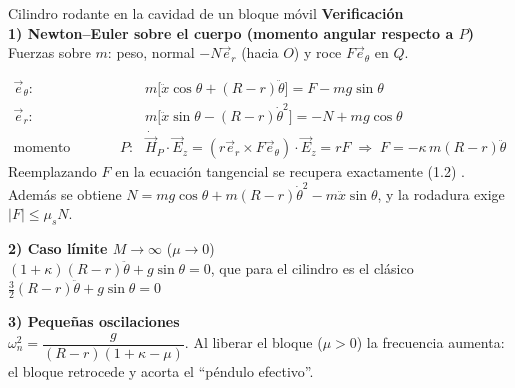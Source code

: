 \begin{solucion}{Cilindro rodante en la cavidad de un bloque móvil}
\textbf{Verificación}\\
\textbf{1) Newton--Euler sobre el cuerpo (momento angular respecto a $P$)}\\
Fuerzas sobre $m$: peso, normal $-N\vec{e}_r$ (hacia $O$) y roce $F\vec{e}_\theta$ en $Q$.
\begin{center}
\end{center}
\begin{align*}
\vec{e}_\theta:&\quad m\big[\ddot x\cos\theta + (R-r)\ddot\theta\big] = F - m g\sin\theta \\
\vec{e}_r:&\quad m\big[\ddot x\sin\theta - (R-r)\dot\theta^2\big] = -N + m g\cos\theta \\
\text{momento angular en }P:&\quad \dot{\vec{H}}_P\cdot\vec{E}_z = (r\vec{e}_r\times F\vec{e}_\theta)\cdot\vec{E}_z = rF
\;\Rightarrow\; F = -\kappa\, m (R-r)\ddot\theta
\end{align*}
Reemplazando $F$ en la ecuación tangencial se recupera exactamente (1.2) \checkmark. Además se obtiene $N = m g\cos\theta + m(R-r)\dot\theta^2 - m\ddot x\sin\theta$, y la rodadura exige $|F|\le\mu_s N$.
 
\textbf{2) Caso límite $M\to\infty$} ($\mu\to0$)\\
$(1+\kappa)(R-r)\ddot\theta + g\sin\theta = 0$, que para el cilindro es el clásico $\tfrac32(R-r)\ddot\theta+g\sin\theta=0$ \checkmark
 
\textbf{3) Pequeñas oscilaciones}\\
$\omega_n^2 = \dfrac{g}{(R-r)(1+\kappa-\mu)}$. Al liberar el bloque ($\mu>0$) la frecuencia aumenta: el bloque retrocede y acorta el ``péndulo efectivo''.
\end{solucion}
